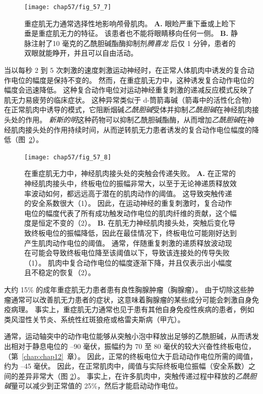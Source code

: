 \begin{figure}[htbp]
	\centering
	\texttt{[image: chap57/fig\_57\_7]}
	\caption{重症肌无力通常选择性地影响颅骨肌肉。
		\textbf{A.} 眼睑严重下垂或上睑下垂是重症肌无力的特征。
		该患者也不能将眼睛移向任何一侧。
		\textbf{B.} 静脉注射了10 毫克的乙酰胆碱酯酶抑制剂\textit{腾喜龙} 后仅 1 分钟，患者的双眼就能睁开，并且可以自由活动。}
	\label{fig:57_7}
\end{figure}


当以每秒 2 到 5 次刺激的速度刺激运动神经时，在正常人体肌肉中诱发的复合动作电位的幅度是保持不变的。
然而，在重症肌无力中，这种诱发复合动作电位的幅度会迅速降低。
这种复合动作电位对运动神经重复刺激的递减反应模式反映了肌无力易疲劳的临床症状。
这种异常类似于 d-筒箭毒碱（箭毒中的活性化合物）在正常肌肉中诱导的模式，它阻断烟碱\textit{乙酰胆碱}受体并抑制\textit{乙酰胆碱}在神经肌肉接头处的作用。
\textit{新斯的明}这种药物可以抑制乙酰胆碱酯酶，从而增加\textit{乙酰胆碱}在神经肌肉接头处的作用持续时间，从而逆转肌无力患者诱发的复合动作电位幅度的降低（图~\ref{fig:57_8}）。


\begin{figure}[htbp]
	\centering
	\texttt{[image: chap57/fig\_57\_8]}
	\caption{在重症肌无力中，神经肌肉接头处的突触会传递失败。
		\textbf{A.} 在正常的神经肌肉接头中，终板电位的振幅非常大，以至于无论神递质释放效率波动如何，都远远高于潜在的肌肉动作的阈值。
		这导致突触传递的安全系数很大（1）。
		因此，在运动神经的重复刺激时，复合动作电位的幅度代表了所有成功触发动作电位的肌肉纤维的贡献，这个幅度是恒定不变的（2）。
		\textbf{B.} 在肌无力神经肌肉接头处，突触后变化导致终板电位的振幅降低，因此在最佳情况下，终板电位可能刚好达到产生肌肉动作电位的阈值。
		通常，伴随重复刺激的递质释放波动现在可能会导致终板电位降至该阈值以下，导致该连接处的传导失败（1）。
		肌肉中复合动作电位的幅度逐渐下降，并且仅表示出小幅度且不稳定的恢复（2）。}
	\label{fig:57_8}
\end{figure}


大约 15\% 的成年重症肌无力患者患有良性胸腺肿瘤（胸腺瘤）。
由于切除这些肿瘤通常可以改善肌无力患者的症状，这意味着胸腺瘤的某些成分可能会刺激自身免疫病理。
事实上，重症肌无力通常也见于患有其他自身免疫性疾病的患者，例如类风湿性关节炎、系统性红斑狼疮或格雷夫斯病（甲亢）。


通常，运动轴突中的动作电位能够从突触小泡中释放出足够的乙酰胆碱，从而诱发出相对于静息电位的 –90 毫伏，振幅约为 70 至 80 毫伏的较大兴奋性终板电位，（第~\ref{chap:chap12}~章）。
因此，正常的终板电位大于启动动作电位所需的阈值，约为 –45 毫伏。
因此，在正常肌肉中，阈值与实际终板电位振幅（安全系数）之间的差异非常大（图 \ref{fig:57_8}）。
事实上，在许多肌肉中，突触传递过程中释放的\textit{乙酰胆碱}量可以减少到正常值的 25\%，然后才能启动动作电位。



